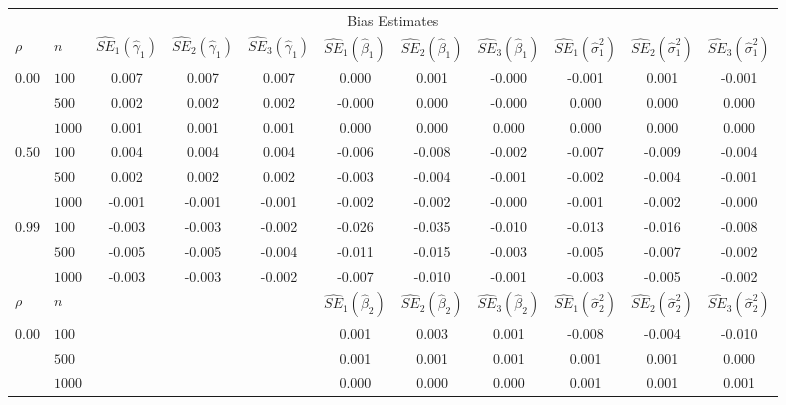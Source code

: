 \begin{table}[ht]
\begin{center}
\begin{tabular}{llccccccccc}
   \hline \multicolumn{11}{c}{Bias Estimates}\\ $\rho$ & $n$ & $\widehat{SE}_1(\widehat{\gamma}_1)$ & $\widehat{SE}_2(\widehat{\gamma}_1)$ & $\widehat{SE}_3(\widehat{\gamma}_1)$ & $\widehat{SE}_1(\widehat{\beta}_1)$ & $\widehat{SE}_2(\widehat{\beta}_1)$ & $\widehat{SE}_3(\widehat{\beta}_1)$ & $\widehat{SE}_1(\widehat{\sigma}^2_1)$ & $\widehat{SE}_2(\widehat{\sigma}^2_1)$ & $\widehat{SE}_3(\widehat{\sigma}^2_1)$ \\ 
   \hline$0.00$ & $100$ & 0.007 & 0.007 & 0.007 & 0.000 & 0.001 & -0.000 & -0.001 & 0.001 & -0.001 \\ 
    & $500$ & 0.002 & 0.002 & 0.002 & -0.000 & 0.000 & -0.000 & 0.000 & 0.000 & 0.000 \\ 
    & $1000$ & 0.001 & 0.001 & 0.001 & 0.000 & 0.000 & 0.000 & 0.000 & 0.000 & 0.000 \\ 
  $0.50$ & $100$ & 0.004 & 0.004 & 0.004 & -0.006 & -0.008 & -0.002 & -0.007 & -0.009 & -0.004 \\ 
    & $500$ & 0.002 & 0.002 & 0.002 & -0.003 & -0.004 & -0.001 & -0.002 & -0.004 & -0.001 \\ 
    & $1000$ & -0.001 & -0.001 & -0.001 & -0.002 & -0.002 & -0.000 & -0.001 & -0.002 & -0.000 \\ 
  $0.99$ & $100$ & -0.003 & -0.003 & -0.002 & -0.026 & -0.035 & -0.010 & -0.013 & -0.016 & -0.008 \\ 
    & $500$ & -0.005 & -0.005 & -0.004 & -0.011 & -0.015 & -0.003 & -0.005 & -0.007 & -0.002 \\ 
    & $1000$ & -0.003 & -0.003 & -0.002 & -0.007 & -0.010 & -0.001 & -0.003 & -0.005 & -0.002 \\ 
   \hline$\rho$ & $n$ &   &   &   & $\widehat{SE}_1(\widehat{\beta}_2)$ & $\widehat{SE}_2(\widehat{\beta}_2)$ & $\widehat{SE}_3(\widehat{\beta}_2)$ & $\widehat{SE}_1(\widehat{\sigma}^2_2)$ & $\widehat{SE}_2(\widehat{\sigma}^2_2)$ & $\widehat{SE}_3(\widehat{\sigma}^2_2)$ \\ 
   \hline$0.00$ & $100$ &   &   &   & 0.001 & 0.003 & 0.001 & -0.008 & -0.004 & -0.010 \\ 
    & $500$ &   &   &   & 0.001 & 0.001 & 0.001 & 0.001 & 0.001 & 0.000 \\ 
    & $1000$ &   &   &   & 0.000 & 0.000 & 0.000 & 0.001 & 0.001 & 0.001 \\ 

\end{tabular}
\end{center}
\end{table}
